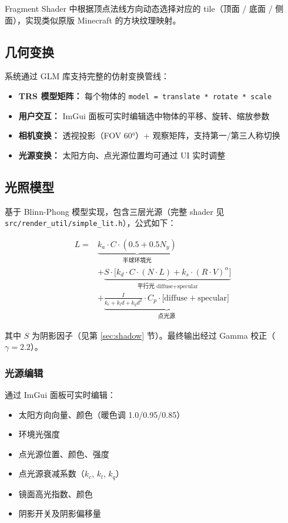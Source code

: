 \documentclass{article}
\begin{document}
Fragment Shader 中根据顶点法线方向动态选择对应的 tile（顶面 / 底面 / 侧面），实现类似原版 Minecraft 的方块纹理映射。

\subsection{几何变换}

系统通过 GLM 库支持完整的仿射变换管线：
\begin{itemize}[nosep]
    \item \textbf{TRS 模型矩阵：} 每个物体的 \texttt{model = translate * rotate * scale}
    \item \textbf{用户交互：} ImGui 面板可实时编辑选中物体的平移、旋转、缩放参数
    \item \textbf{相机变换：} 透视投影（FOV 60°）+ 观察矩阵，支持第一/第三人称切换
    \item \textbf{光源变换：} 太阳方向、点光源位置均可通过 UI 实时调整
\end{itemize}

\subsection{光照模型}

基于 Blinn-Phong 模型实现，包含三层光源（完整 shader 见 \texttt{src/render\_util/simple\_lit.h}），公式如下：

\[
\begin{aligned}
L = &\underbrace{k_a \cdot C \cdot (0.5 + 0.5 N_y)}_{\text{半球环境光}} \\
    &+ \underbrace{S \cdot \big[k_d \cdot C \cdot (N \cdot L) + k_s \cdot (R \cdot V)^\alpha\big]}_{\text{平行光 diffuse+specular}} \\
    &+ \underbrace{\frac{I}{k_c + k_l d + k_q d^2} \cdot C_p \cdot \big[\text{diffuse} + \text{specular}\big]}_{\text{点光源}}
\end{aligned}
\]

其中 $S$ 为阴影因子（见第 \ref{sec:shadow} 节）。最终输出经过 Gamma 校正（$\gamma = 2.2$）。

\subsubsection{光源编辑}
通过 ImGui 面板可实时编辑：
\begin{itemize}[nosep]
    \item 太阳方向向量、颜色（暖色调 1.0/0.95/0.85）
    \item 环境光强度
    \item 点光源位置、颜色、强度
    \item 点光源衰减系数（$k_c$, $k_l$, $k_q$）
    \item 镜面高光指数、颜色
    \item 阴影开关及阴影偏移量
\end{itemize}
\end{document}
